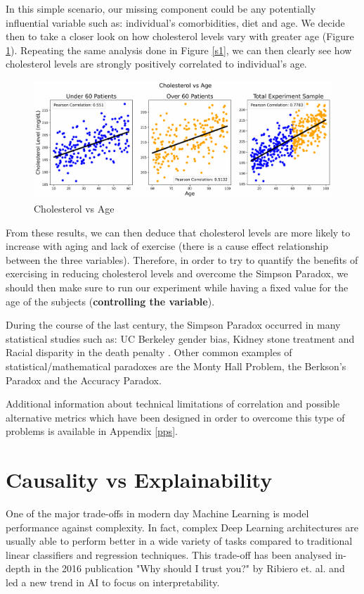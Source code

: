 In this simple scenario, our missing component could be any potentially influential variable such as: individual's comorbidities, diet and age. We decide then to take a closer look on how cholesterol levels vary with greater age (Figure \ref{s2}). Repeating the same analysis done in Figure \ref{s1}, we can then clearly see how cholesterol levels are strongly positively correlated to individual's age.

\begin{figure}[ht!]%
    \centering
    \includegraphics[width=1\linewidth]{latex/images/simpson2.pdf}
    \vspace{-0.2cm}
    \caption{Cholesterol vs Age}
    \label{s2}
\end{figure}

From these results, we can then deduce that cholesterol levels are more likely to increase with aging and lack of exercise (there is a cause effect relationship between the three variables). Therefore, in order to try to quantify the benefits of exercising in reducing cholesterol levels and overcome the Simpson Paradox, we should then make sure to run our experiment while having a fixed value for the age of the subjects (\textbf{controlling the variable}).   

During the course of the last century, the Simpson Paradox occurred in many statistical studies such as: UC Berkeley gender bias, Kidney stone treatment and Racial disparity in the death penalty \cite{simpara}. Other common examples of statistical/mathematical paradoxes are the Monty Hall Problem, the Berkson's Paradox and the Accuracy Paradox.

Additional information about technical limitations of correlation and possible alternative metrics which have been designed in order to overcome this type of problems is available in Appendix \ref{pps}.

\section{Causality vs Explainability}
One of the major trade-offs in modern day Machine Learning is model performance against complexity. In fact, complex Deep Learning architectures are usually able to perform better in a wide variety of tasks compared to traditional linear classifiers and regression techniques. This trade-off has been analysed in-depth in the 2016 publication "Why should I trust you?" by Ribiero et. al. \cite{otto} and led a new trend in AI to focus on interpretability.

